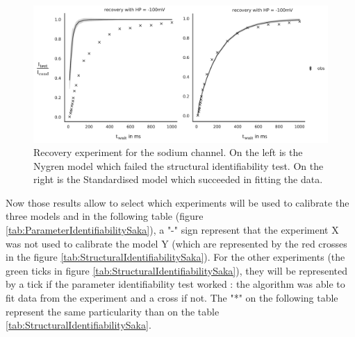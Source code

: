 \documentclass[11pt]{report}
\begin{document}
\begin{figure}[H]
    \centering
    \begin{measuredfigure}
    \includegraphics[width = \textwidth]{figures/structuralIdentifiabilityRecovSaka.png}
    \captionsetup{singlelinecheck = false, format= hang, justification=raggedright, font=footnotesize, labelsep=space}
	\caption{Recovery experiment for the sodium channel. On the left is the Nygren \cite{Nygren1998} model which failed the structural identifiability test. On the right is the Standardised model which succeeded in fitting the data.
}
	\end{measuredfigure}
      \addtocounter{figure}{-1}
	\label{fig:StructuralIdentifiabilityRecovSka}
\end{figure}

Now those results allow to select which experiments will be used to calibrate the three models and in the following table (figure \ref{tab:ParameterIdentifiabilitySaka}), a "-" sign represent that the experiment X was not used to calibrate the model Y (which are represented by the red crosses in the figure \ref{tab:StructuralIdentifiabilitySaka}). For the other experiments (the green ticks in figure \ref{tab:StructuralIdentifiabilitySaka}), they will be represented by a tick if the parameter identifiability test worked : the algorithm was able to fit data from the experiment and a cross if not. The "*" on the following table represent the same particularity than on the table \ref{tab:StructuralIdentifiabilitySaka}.
\end{document}
